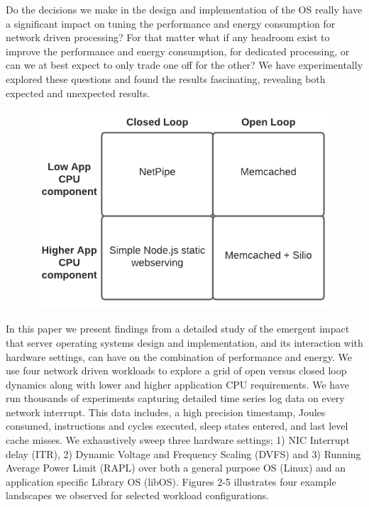 Do the decisions we make in the design and implementation of the OS really have
a significant impact on tuning the performance and energy consumption for
network driven processing?  
For that matter what if any headroom exist to improve the performance and
energy consumption, for dedicated processing, or can we at best expect to only
trade one off for the other?   
We have experimentally explored these questions
and found the results fascinating, revealing both expected and unexpected
results.

\begin{figure}
\vspace{-0.3in}
\begin{center}
 \includegraphics[width=.6\columnwidth]{figures/expgrid.pdf}
\vspace{-.5in}
\end{center}    
\end{figure}  
In this paper we present findings from a detailed study of the emergent impact
that server operating systems design and implementation, and its interaction
with hardware settings, can have on the combination of performance and energy. 
We use four network driven workloads to explore a grid of open versus closed
loop dynamics along with lower and higher application CPU requirements. 
 We have run thousands of experiments capturing detailed time series log data
on every network interrupt.  This data includes, a high precision timestamp,
Joules consumed, instructions and cycles executed, sleep states entered, and
last level cache misses.  We exhaustively sweep three hardware settings; 1) NIC
Interrupt delay (ITR), 2) Dynamic Voltage and Frequency Scaling (DVFS) and 3)
Running Average Power Limit (RAPL) over both a general purpose OS (Linux) and
an application specific Library OS (libOS).    Figures 2-5 illustrates four
example landscapes we observed for selected workload configurations.  
 
